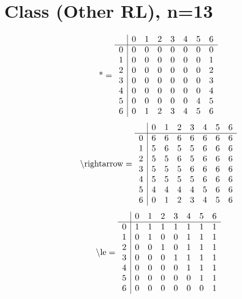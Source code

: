 \documentclass[11pt]{article}
\begin{document}
\section{Class (Other RL), n=13}
\[\text{*} = 
\begin{array}{r | r r r r r r r}
 & 0 & 1 & 2 & 3 & 4 & 5 & 6 \\ \hline
0 & 0 & 0 & 0 & 0 & 0 & 0 & 0 \\
1 & 0 & 0 & 0 & 0 & 0 & 0 & 1 \\
2 & 0 & 0 & 0 & 0 & 0 & 0 & 2 \\
3 & 0 & 0 & 0 & 0 & 0 & 0 & 3 \\
4 & 0 & 0 & 0 & 0 & 0 & 0 & 4 \\
5 & 0 & 0 & 0 & 0 & 0 & 4 & 5 \\
6 & 0 & 1 & 2 & 3 & 4 & 5 & 6 \\
\end{array}
\]
\[\text{\textbackslash rightarrow} = 
\begin{array}{r | r r r r r r r}
 & 0 & 1 & 2 & 3 & 4 & 5 & 6 \\ \hline
0 & 6 & 6 & 6 & 6 & 6 & 6 & 6 \\
1 & 5 & 6 & 5 & 5 & 6 & 6 & 6 \\
2 & 5 & 5 & 6 & 5 & 6 & 6 & 6 \\
3 & 5 & 5 & 5 & 6 & 6 & 6 & 6 \\
4 & 5 & 5 & 5 & 5 & 6 & 6 & 6 \\
5 & 4 & 4 & 4 & 4 & 5 & 6 & 6 \\
6 & 0 & 1 & 2 & 3 & 4 & 5 & 6 \\
\end{array}
\]
\[\text{\textbackslash le} = 
\begin{array}{r | r r r r r r r}
 & 0 & 1 & 2 & 3 & 4 & 5 & 6 \\ \hline
0 & 1 & 1 & 1 & 1 & 1 & 1 & 1 \\
1 & 0 & 1 & 0 & 0 & 1 & 1 & 1 \\
2 & 0 & 0 & 1 & 0 & 1 & 1 & 1 \\
3 & 0 & 0 & 0 & 1 & 1 & 1 & 1 \\
4 & 0 & 0 & 0 & 0 & 1 & 1 & 1 \\
5 & 0 & 0 & 0 & 0 & 0 & 1 & 1 \\
6 & 0 & 0 & 0 & 0 & 0 & 0 & 1 \\
\end{array}
\]
\end{document}
